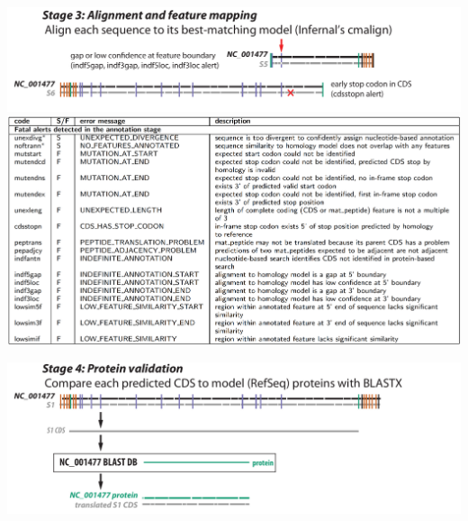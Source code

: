 \documentclass[landscape]{slides}
\begin{document}
\begin{slide}
\begin{center}

\includegraphics[width=10.5in]{figs/v-annotate-stage3-4}
\includegraphics[width=10.5in]{figs/ss-alignment-alert-list}

\end{center}
\vfill
\end{slide}
\begin{slide}
\begin{center}

\includegraphics[width=10.5in]{figs/v-annotate-stage4-1}

\end{center}
\vfill
\end{slide}
\end{document}
